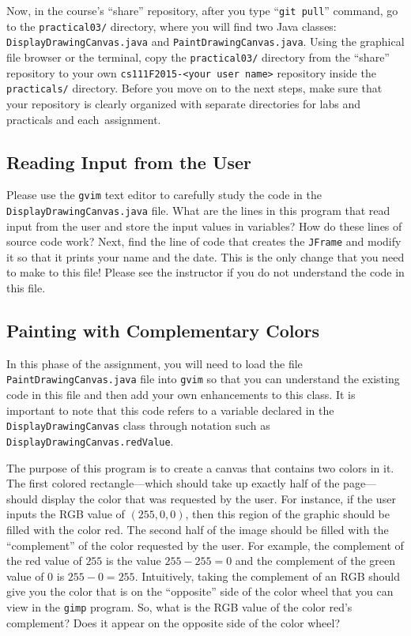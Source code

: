 Now, in the course's ``share'' repository, after you type ``{\tt git pull}'' command, go to the {\tt practical03/}
directory, where you will find two Java classes: {\tt DisplayDrawingCanvas.java} and {\tt PaintDrawingCanvas.java}.
Using the graphical file browser or the terminal, copy the {\tt practical03/} directory from the ``share''
repository to your own {\tt cs111F2015-<your user name>} repository inside the {\tt practicals/} directory. Before you
move on to the next steps, make sure that your repository is clearly organized with separate directories for labs and
practicals and \mbox{each assignment}.

\vspace*{-.1in}
\subsection*{Reading Input from the User}

Please use the {\tt gvim} text editor to carefully study the code in the {\tt DisplayDrawingCanvas.java} file. What are
the lines in this program that read input from the user and store the input values in variables? How do these lines of
source code work? Next, find the line of code that creates the {\tt JFrame} and modify it so that it prints your name
and the date. This is the only change that you need to make to this file! Please see the instructor if you do not
understand the code in this file.

\vspace*{-.2in}
\subsection*{Painting with Complementary Colors}

In this phase of the assignment, you will need to load the file {\tt PaintDrawingCanvas.java} file into {\tt gvim} so
that you can understand the existing code in this file and then add your own enhancements to this class. It is important
to note that this code refers to a variable declared in the {\tt DisplayDrawingCanvas} class through notation such as
{\tt DisplayDrawingCanvas.redValue}.

The purpose of this program is to create a canvas that contains two colors in it. The first colored rectangle---which
should take up exactly half of the page---should display the color that was requested by the user. For instance, if the
user inputs the RGB value of $(255,0,0)$, then this region of the graphic should be filled with the color red. The
second half of the image should be filled with the ``complement'' of the color requested by the user. For example, the
complement of the red value of $255$ is the value $255-255=0$ and the complement of the green value of $0$ is
$255-0=255$. Intuitively, taking the complement of an RGB should give you the color that is on the ``opposite'' side of
the color wheel that you can view in the {\tt gimp} program. So, what is the RGB value of the color red's complement?
Does it appear on the opposite side of the color wheel?

